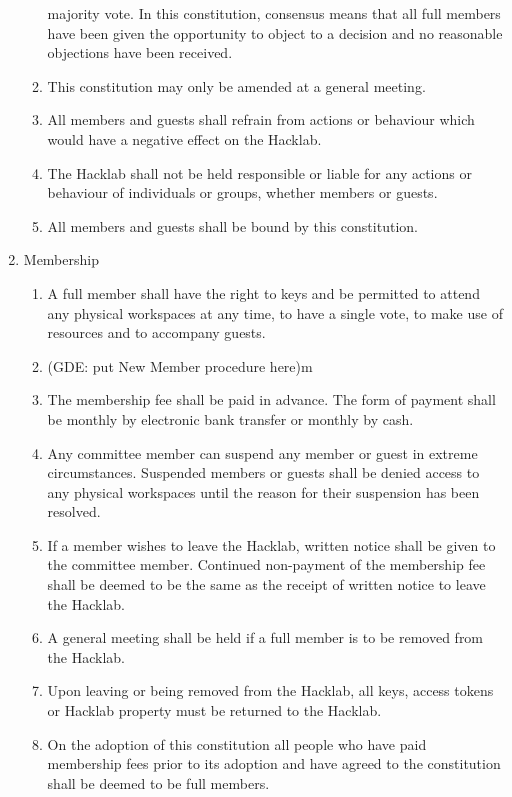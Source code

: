 \documentclass{article}
\begin{document}
\begin{enumerate}
\begin{enumerate}
      majority vote. In this constitution, consensus means that all
      full members have been given the opportunity to object to a
      decision and no reasonable objections have been received.
    \item This constitution may only be amended at a general meeting.
    \item All members and guests shall refrain from actions or
      behaviour which would have a negative effect on the Hacklab.
    \item The Hacklab shall not be held responsible or liable for
      any actions or behaviour of individuals or groups, whether
      members or guests.
    \item All members and guests shall be bound by this constitution.
    \end{enumerate} %
  \item Membership
    \begin{enumerate}
    \item A full member shall have the right to keys and be permitted
      to attend any physical workspaces at any time, to have a single
      vote, to make use of resources and to accompany guests.
    \item (GDE: put New Member procedure here)m
    \item The membership fee shall be paid in advance. The form of
      payment shall be monthly by electronic bank transfer or monthly
      by cash.
    \item Any committee member can suspend any member or guest in
      extreme circumstances. Suspended members or guests shall be
      denied access to any physical workspaces until the reason for
      their suspension has been resolved.
    \item If a member wishes to leave the Hacklab, written notice
      shall be given to the committee member. Continued non-payment of the
      membership fee shall be deemed to be the same as the receipt of
      written notice to leave the Hacklab.
    \item A general meeting shall be held if a full member is to be
      removed from the Hacklab.
    \item Upon leaving or being removed from the Hacklab, all keys,
      access tokens or Hacklab property must be returned to the Hacklab.
    \item On the adoption of this constitution all people who have
      paid membership fees prior to its adoption and have agreed to
      the constitution shall be deemed to be full members.

\end{enumerate}
\end{enumerate}
\end{document}
